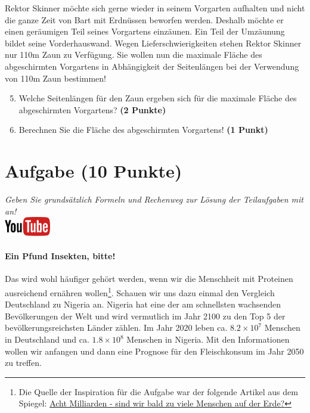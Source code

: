 \documentclass[a4paper, 9pt]{scrartcl}\usepackage[]{graphicx}\usepackage[]{xcolor}
\begin{document}
Rektor Skinner m{\"o}chte sich gerne wieder in seinem Vorgarten aufhalten und
nicht die ganze Zeit von Bart mit Erdn{\"u}ssen beworfen werden. Deshalb m{\"o}chte
er einen ger{\"a}umigen Teil seines Vorgartens einz{\"a}unen. Ein Teil der
Umz{\"a}unung bildet seine Vorderhauswand. Wegen Lieferschwierigkeiten stehen
Rektor Skinner nur 110m Zaun zu Verf{\"u}gung. Sie wollen nun die
maximale Fl{\"a}che des abgeschirmten Vorgartens in Abh{\"a}ngigkeit der
Seitenl{\"a}ngen bei der Verwendung von 110m Zaun bestimmen!

\begin{enumerate}
  \setcounter{enumi}{4}  
\item  Welche Seitenl{\"a}ngen f{\"u}r den Zaun ergeben sich f{\"u}r die
  maximale Fl{\"a}che des abgeschirmten Vorgartens? \textbf{(2 Punkte)}
\item Berechnen Sie die Fl{\"a}che des abgeschirmten Vorgartens! \textbf{(1
    Punkt)}
\end{enumerate}

 
\clearpage

\section{Aufgabe \hfill (10 Punkte)}

\textit{Geben Sie grunds{\"a}tzlich Formeln und Rechenweg zur L{\"o}sung der
  Teilaufgaben mit an!} \\[1Ex]

\hfill\href{https://youtu.be/OhyuH6hzEhY}{\includegraphics[width = 2cm]{img/youtube}} %
\hspace{2Ex}




\paragraph{Ein Pfund Insekten, bitte!} Das wird wohl h{\"a}ufiger geh{\"o}rt
werden, wenn wir die Menschheit mit Proteinen ausreichend ern{\"a}hren
wollen\footnote{Die Quelle der Inspiration f{\"u}r die Aufgabe war der folgende
  Artikel aus dem Spiegel:
  \href{https://www.spiegel.de/ausland/ueberbevoelkerung-acht-milliarden-sind-wir-bald-zu-viele-menschen-auf-der-erde-a-3f20c7bc-3d60-4440-9f52-eb338db207f5}{Acht
    Milliarden - sind wir bald zu viele Menschen auf der Erde?}}. Schauen
wir uns dazu einmal den Vergleich Deutschland zu Nigeria an. Nigeria hat
eine der am schnellsten wachsenden Bev{\"o}lkerungen der Welt und wird
vermutlich im Jahr 2100 zu den Top 5 der bev{\"o}lkerungsreichsten L{\"a}nder
z{\"a}hlen. Im Jahr 2020 leben ca. \ensuremath{8.2\times 10^{7}} Menschen in
Deutschland und ca. \ensuremath{1.8\times 10^{8}} Menschen in Nigeria. Mit den
Informationen wollen wir anfangen und dann eine Prognose f{\"u}r den
Fleischkonsum im Jahr 2050 zu treffen. \\ 
\end{document}
